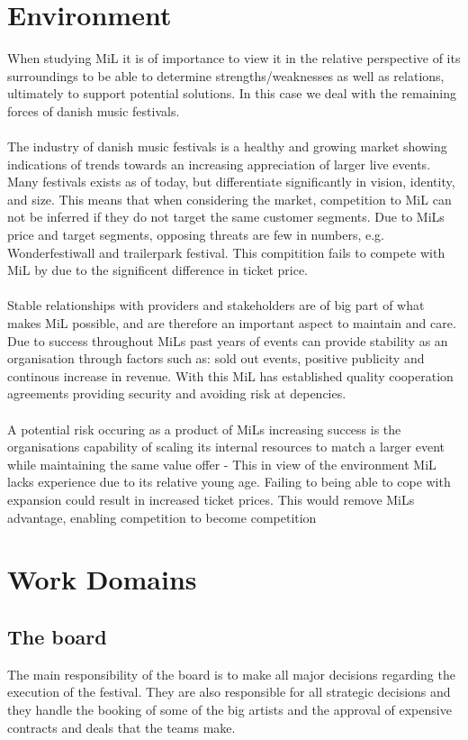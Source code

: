 \section{Environment}
When studying MiL it is of importance to view it in the relative perspective of its surroundings to be able to determine strengths/weaknesses as well as relations, ultimately to support potential solutions. In this case we deal with the remaining forces of danish music festivals.
\\  \\
The industry of danish music festivals is a healthy and growing market showing indications of trends towards an increasing appreciation of larger live events. Many festivals exists as of today, but differentiate significantly in vision, identity, and size. This means that when considering the market, competition to MiL can not be inferred if they do not target the same customer segments. Due to MiLs price and target segments, opposing threats are few in numbers, e.g. Wonderfestiwall and trailerpark festival. This compitition fails to compete with MiL by due to the significent difference in ticket price.
\\  \\
Stable relationships with providers and stakeholders are of big part of what makes MiL possible, and are therefore an important aspect to maintain and care. Due to success throughout MiLs past years of events can provide stability as an organisation through factors such as: sold out events, positive publicity and continous increase in revenue. With this MiL has established quality cooperation agreements providing security and avoiding risk at depencies.
\\  \\
A potential risk occuring as a product of MiLs increasing success is the organisations capability of scaling its internal resources to match a larger event while maintaining the same value offer - This in view of the environment MiL lacks experience due to its relative young age. Failing to being able to cope with expansion could result in increased ticket prices. This would remove MiLs advantage, enabling competition to become competition


\section{Work Domains}
\label{sec:work_domains}
\subsection{The board}
\label{sub:the_board}
The main responsibility of the board is to make all major decisions regarding the execution of the
festival. They are also responsible for all strategic decisions and they handle the booking of
some of the big artists and the approval of expensive contracts and deals that the teams make.

